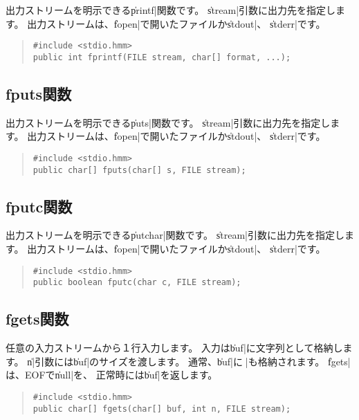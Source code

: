 出力ストリームを明示できる\|printf|関数です。
\|stream|引数に出力先を指定します。
出力ストリームは、\|fopen|で開いたファイルか\|stdout|、
\|stderr|です。

\begin{quote}
\begin{verbatim}
#include <stdio.hmm>
public int fprintf(FILE stream, char[] format, ...);
\end{verbatim}
\end{quote}

\subsection{fputs関数}

出力ストリームを明示できる\|puts|関数です。
\|stream|引数に出力先を指定します。
出力ストリームは、\|fopen|で開いたファイルか\|stdout|、
\|stderr|です。

\begin{quote}
\begin{verbatim}
#include <stdio.hmm>
public char[] fputs(char[] s, FILE stream);
\end{verbatim}
\end{quote}

\subsection{fputc関数}

出力ストリームを明示できる\|putchar|関数です。
\|stream|引数に出力先を指定します。
出力ストリームは、\|fopen|で開いたファイルか\|stdout|、
\|stderr|です。

\begin{quote}
\begin{verbatim}
#include <stdio.hmm>
public boolean fputc(char c, FILE stream);
\end{verbatim}
\end{quote}

\subsection{fgets関数}

任意の入力ストリームから１行入力します。
入力は\|buf|に文字列として格納します。
\|n|引数には\|buf|のサイズを渡します。
通常、\|buf|には\|\n|も格納されます。
\|fgets|は、EOFで\|null|を、
正常時には\|buf|を返します。

\begin{quote}
\begin{verbatim}
#include <stdio.hmm>
public char[] fgets(char[] buf, int n, FILE stream);
\end{verbatim}
\end{quote}

